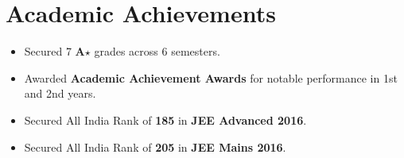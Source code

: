 \section*{Academic Achievements}
\begin{itemize}[itemsep=0mm]

\item Secured 7 \textbf{A$\star$} grades across 6 semesters.
\item Awarded \textbf{Academic Achievement Awards} for notable performance in 1st and 2nd years.
\item Secured All India Rank of {\bf 185} in {\bf JEE Advanced 2016}.
\item Secured All India Rank of {\bf 205} in {\bf JEE Mains 2016}.

\end{itemize}
